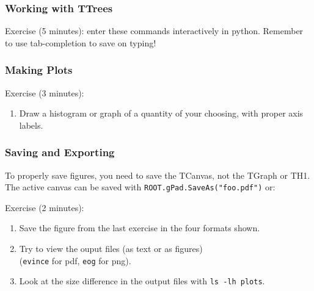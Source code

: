 \documentclass{beamer}
\begin{document}
% 






\begin{frame}\frametitle{Working with TTrees}
Exercise (5 minutes): enter these commands interactively in python.
Remember to use tab-completion to save on typing!

\end{frame}

\begin{frame}\frametitle{Making Plots}

Exercise (3 minutes):
\begin{enumerate}
\item Draw a histogram or graph of a quantity of your choosing, with proper axis labels.
\end{enumerate}
\end{frame}

\begin{frame}\frametitle{Saving and Exporting}
To properly save figures, you need to save the TCanvas, not the TGraph or TH1.  The active canvas can be saved with \lstinline$ROOT.gPad.SaveAs("foo.pdf")$ or:

Exercise (2 minutes):
\begin{enumerate}
\item Save the figure from the last exercise in the four formats shown.  
\item Try to view the ouput files (as text or as figures)\\
(\lstinline$evince$ for pdf, \lstinline$eog$ for png).
\item Look at the size difference in the output files with \lstinline$ls -lh plots$.
\end{enumerate}
\label{saving}
\end{frame}
\end{document}
